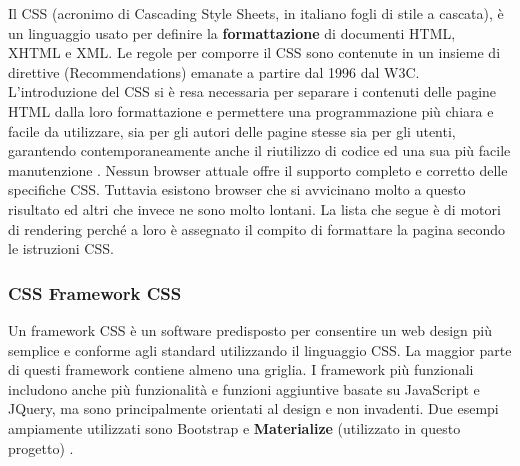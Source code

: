 Il CSS (acronimo di Cascading Style Sheets, in italiano fogli di stile a cascata), è un linguaggio usato per definire la \textbf{formattazione} di documenti HTML, XHTML e XML. Le regole per comporre il CSS sono contenute in un insieme di direttive (Recommendations) emanate a partire dal 1996 dal W3C.
L'introduzione del CSS si è resa necessaria per separare i contenuti delle pagine HTML dalla loro formattazione e permettere una programmazione più chiara e facile da utilizzare, sia per gli autori delle pagine stesse sia per gli utenti, garantendo contemporaneamente anche il riutilizzo di codice ed una sua più facile manutenzione \cite{sito_CSS}.
Nessun browser attuale offre il supporto completo e corretto delle specifiche CSS. Tuttavia esistono browser che si avvicinano molto a questo risultato ed altri che invece ne sono molto lontani. La lista che segue è di motori di rendering perché a loro è assegnato il compito di formattare la pagina secondo le istruzioni CSS.

\subsubsection{CSS Framework CSS}
Un framework CSS è un software predisposto per consentire un web design più semplice e conforme agli standard utilizzando il linguaggio CSS. La maggior parte di questi framework contiene almeno una griglia. I framework più funzionali includono anche più funzionalità e funzioni aggiuntive basate su JavaScript e JQuery, ma sono principalmente orientati al design e non invadenti. \newline
Due esempi ampiamente utilizzati sono Bootstrap e \textbf{Materialize} (utilizzato in questo progetto) \cite{sito_framework_css}.

